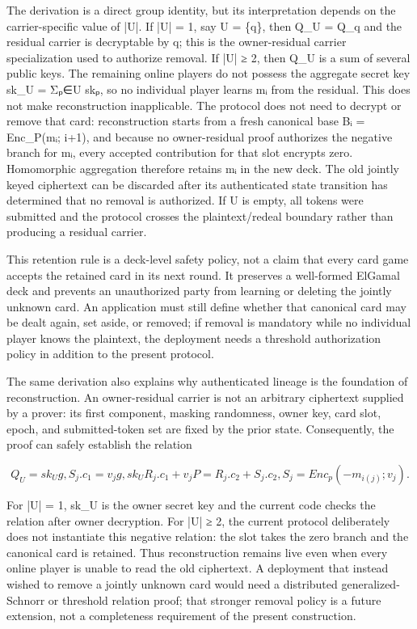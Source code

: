 \documentclass[11pt]{article}
\begin{document}
The derivation is a direct group identity, but its interpretation depends on the carrier-specific value of |U|. If |U| = 1, say U = \{q\}, then Q\_U = Q\_q and the residual carrier is decryptable by q; this is the owner-residual carrier specialization used to authorize removal. If |U| ≥ 2, then Q\_U is a sum of several public keys. The remaining online players do not possess the aggregate secret key sk\_U = Σₚ∈U skₚ, so no individual player learns mᵢ from the residual. This does not make reconstruction inapplicable. The protocol does not need to decrypt or remove that card: reconstruction starts from a fresh canonical base Bᵢ = Enc\_P(mᵢ; i+1), and because no owner-residual proof authorizes the negative branch for mᵢ, every accepted contribution for that slot encrypts zero. Homomorphic aggregation therefore retains mᵢ in the new deck. The old jointly keyed ciphertext can be discarded after its authenticated state transition has determined that no removal is authorized. If U is empty, all tokens were submitted and the protocol crosses the plaintext/redeal boundary rather than producing a residual carrier.

This retention rule is a deck-level safety policy, not a claim that every card game accepts the retained card in its next round. It preserves a well-formed ElGamal deck and prevents an unauthorized party from learning or deleting the jointly unknown card. An application must still define whether that canonical card may be dealt again, set aside, or removed; if removal is mandatory while no individual player knows the plaintext, the deployment needs a threshold authorization policy in addition to the present protocol.

The same derivation also explains why authenticated lineage is the foundation of reconstruction. An owner-residual carrier is not an arbitrary ciphertext supplied by a prover: its first component, masking randomness, owner key, card slot, epoch, and submitted-token set are fixed by the prior state. Consequently, the proof can safely establish the relation

\begin{displaymath}Q_U = sk_U g,   S_{j}.c_{1} = v_{j}g,   sk_U R_{j}.c_{1} + v_{j}P = R_{j}.c_{2} + S_{j}.c_{2},   S_{j} = Enc_{p}(-m_{i(j)}; v_{j}).\end{displaymath}

For |U| = 1, sk\_U is the owner secret key and the current code checks the relation after owner decryption. For |U| ≥ 2, the current protocol deliberately does not instantiate this negative relation: the slot takes the zero branch and the canonical card is retained. Thus reconstruction remains live even when every online player is unable to read the old ciphertext. A deployment that instead wished to remove a jointly unknown card would need a distributed generalized-Schnorr or threshold relation proof; that stronger removal policy is a future extension, not a completeness requirement of the present construction.
\end{document}
